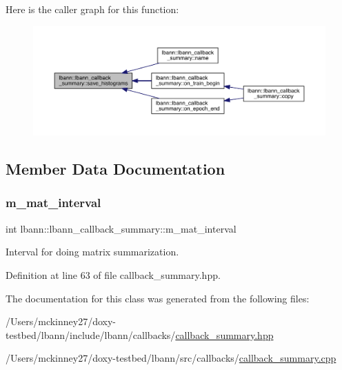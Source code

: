 Here is the caller graph for this function\+:\nopagebreak
\begin{figure}[H]
\begin{center}
\leavevmode
\includegraphics[width=350pt]{classlbann_1_1lbann__callback__summary_a72a46c51527a02516584ce1e49e5cd29_icgraph}
\end{center}
\end{figure}


\subsection{Member Data Documentation}
\mbox{\label{classlbann_1_1lbann__callback__summary_ad123c5383ce6fe1212e25021579d6e3d}} 
\subsubsection{\texorpdfstring{m\+\_\+mat\+\_\+interval}{m\_mat\_interval}}
{\footnotesize\ttfamily int lbann\+::lbann\+\_\+callback\+\_\+summary\+::m\+\_\+mat\+\_\+interval\hspace{0.3cm}{\ttfamily [protected]}}

Interval for doing matrix summarization. 

Definition at line 63 of file callback\+\_\+summary.\+hpp.



The documentation for this class was generated from the following files\+:\begin{DoxyCompactItemize}
\item 
/\+Users/mckinney27/doxy-\/testbed/lbann/include/lbann/callbacks/\hyperlink{callback__summary_8hpp}{callback\+\_\+summary.\+hpp}\item 
/\+Users/mckinney27/doxy-\/testbed/lbann/src/callbacks/\hyperlink{callback__summary_8cpp}{callback\+\_\+summary.\+cpp}\end{DoxyCompactItemize}
